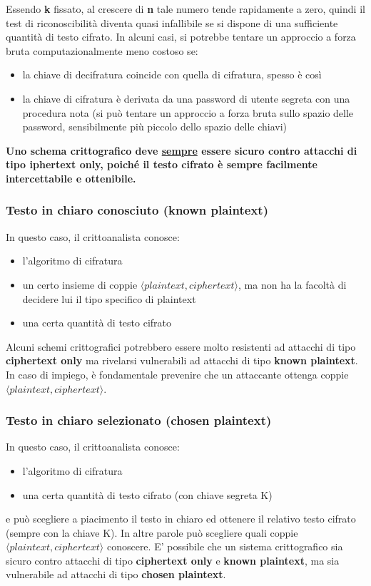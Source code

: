 Essendo \textbf{k} fissato, al crescere di \textbf{n} tale numero tende rapidamente a zero, quindi il test di riconoscibilità diventa quasi infallibile se si dispone di una sufficiente quantità di testo cifrato. In alcuni casi, si potrebbe tentare un approccio a forza bruta computazionalmente meno costoso se:
\begin{itemize} 
  \item la chiave di decifratura coincide con quella di cifratura, spesso è così
  \item la chiave di cifratura è derivata da una password di utente segreta con una procedura nota (si può tentare un approccio a forza bruta sullo spazio delle password, sensibilmente più piccolo dello spazio delle chiavi)
\end{itemize}
\textbf{Uno schema crittografico deve \underline{sempre} essere sicuro contro attacchi di tipo iphertext only, poiché il testo cifrato è sempre facilmente intercettabile e ottenibile.}

\subsubsection{Testo in chiaro conosciuto (known plaintext)}
In questo caso, il crittoanalista conosce:
\begin{itemize} 
  \item l’algoritmo di cifratura
  \item un certo insieme di coppie $\langle plaintext, ciphertext \rangle$, ma non ha la facoltà di decidere lui il tipo specifico di plaintext
  \item una certa quantità di testo cifrato
\end{itemize}
Alcuni schemi crittografici potrebbero essere molto resistenti ad attacchi di tipo \textbf{ciphertext only} ma rivelarsi vulnerabili ad attacchi di tipo \textbf{known plaintext}. In caso di impiego, è fondamentale prevenire che un attaccante ottenga coppie $\langle plaintext, ciphertext \rangle$.

\subsubsection{Testo in chiaro selezionato (chosen plaintext)}
In questo caso, il crittoanalista conosce:
\begin{itemize} 
  \item l’algoritmo di cifratura
  \item una certa quantità di testo cifrato (con chiave segreta K)
\end{itemize}
e può scegliere a piacimento il testo in chiaro ed ottenere il relativo testo cifrato (sempre con la chiave K). In altre parole può scegliere quali coppie $\langle plaintext, ciphertext \rangle$ conoscere. E' possibile che un sistema crittografico sia sicuro contro attacchi di tipo \textbf{ciphertext only} e \textbf{known plaintext}, ma sia vulnerabile ad attacchi di tipo \textbf{chosen plaintext}.


